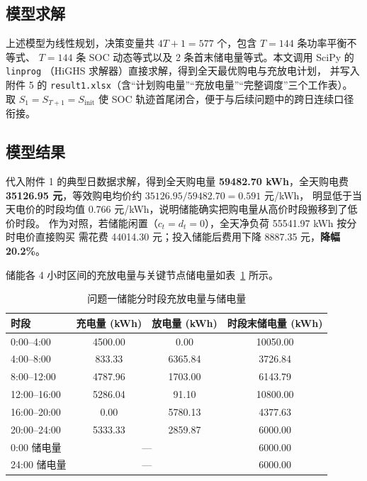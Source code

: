 \documentclass[12pt,a4paper]{article}
\begin{document}
\subsection{模型求解}

上述模型为线性规划，决策变量共 $4T + 1 = 577$ 个，包含 $T = 144$ 条功率平衡不等式、
$T = 144$ 条 SOC 动态等式以及 2 条首末储电量等式。本文调用 SciPy 的 \texttt{linprog}
（HiGHS 求解器）直接求解，得到全天最优购电与充放电计划，
并写入附件 5 的 \texttt{result1.xlsx}（含“计划购电量”“充放电量”“完整调度”三个工作表）。
取 $S_1 = S_{T+1} = S_{\text{init}}$ 使 SOC 轨迹首尾闭合，便于与后续问题中的跨日连续口径衔接。

\subsection{模型结果}

代入附件 1 的典型日数据求解，得到全天购电量 \textbf{59482.70 kWh}，全天购电费
\textbf{35126.95 元}，等效购电均价约 $35126.95 / 59482.70 = 0.591$ 元/kWh，
明显低于当天电价的时段均值 0.766 元/kWh，说明储能确实把购电量从高价时段搬移到了低价时段。
作为对照，若储能闲置（$c_t = d_t = 0$），全天净负荷 55541.97 kWh 按分时电价直接购买
需花费 44014.30 元；投入储能后费用下降 8887.35 元，\textbf{降幅 20.2\%}。

储能各 4 小时区间的充放电量与关键节点储电量如表~\ref{tab:q1-storage} 所示。

\begin{table}[htbp]
\centering
\caption{问题一储能分时段充放电量与储电量}
\label{tab:q1-storage}
\begin{tabular}{lccc}
\toprule
\textbf{时段} & \textbf{充电量 (kWh)} & \textbf{放电量 (kWh)} & \textbf{时段末储电量 (kWh)} \\
\midrule
0:00--4:00   & 4500.00 & 0.00    & 10050.00 \\
4:00--8:00   & 833.33  & 6365.84 & 3726.84  \\
8:00--12:00  & 4787.96 & 1703.00 & 6143.79  \\
12:00--16:00 & 5286.04 & 91.10   & 10800.00 \\
16:00--20:00 & 0.00    & 5780.13 & 4377.63  \\
20:00--24:00 & 5333.33 & 2859.87 & 6000.00  \\
\midrule
0:00 储电量  & \multicolumn{2}{c}{---} & 6000.00 \\
24:00 储电量 & \multicolumn{2}{c}{---} & 6000.00 \\
\bottomrule
\end{tabular}
\end{table}
\end{document}
